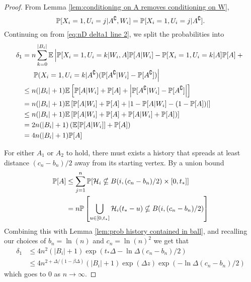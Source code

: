\begin{proof}
		From Lemma \ref{lem:conditioning on A removes conditioning on W},
		\begin{equation}
			\mathbb{P}[X_i = 1, U_i = j | A^\complement, W_i] = \mathbb{P}[X_i = 1, U_i = j | A^\complement].
		\end{equation} 
		Continuing on from \eqref{eq:nD delta1 line 2}, we split the probabilities into
		\begin{align}
			\delta_1 &= n \sum_{k = 0}^{|B_i|} \mathbb{E} \left| \mathbb{P}[X_i = 1, U_i = k|W_i, A]\mathbb{P}[A|W_i] - \mathbb{P}[X_i = 1, U_i = k| A]\mathbb{P}[A] + \vphantom{A^\complement} \right.\\
			&\hphantom{= .} \left.\mathbb{P}(X_i = 1, U_i = k | A^\complement) (\mathbb{P}[A^\complement|W_i] - \mathbb{P}[A^\complement]) \right| \notag \\
			&\leq n (|B_i| + 1) \mathbb{E}\left[ \mathbb{P}[A|W_i] + \mathbb{P}[A] + \left|\mathbb{P}[A^\complement|W_i] - \mathbb{P}[A^\complement]\right|\right]\\
			&= n (|B_i| + 1) \mathbb{E}\left[ \mathbb{P}[A|W_i] + \mathbb{P}[A] + \left|1 - \mathbb{P}[A|W_i] - (1 - \mathbb{P}[A])\right|\right]\\
			&\leq n (|B_i| + 1) \mathbb{E}\left[ \mathbb{P}[A|W_i] + \mathbb{P}[A] + \mathbb{P}[A|W_i] + \mathbb{P}[A])\right]\\
			&= 2 n (|B_i| + 1) \left(\mathbb{E}[\mathbb{P}[A|W_i]] + \mathbb{P}[A]\right)\\
			&= 4 n (|B_i| + 1) \mathbb{P}[A]
		\end{align}

		For either $A_1$ or $A_2$ to hold, there must exists a history that spreads at least distance $(c_n - b_n) / 2$ away from its starting vertex. 
		By a union bound
		\begin{align}
			\mathbb{P}[A] &\leq \sum_{j = 1}^n \mathbb{P}[\mathcal{H}_i \nsubseteq B(i, (c_n - b_n)/2) \times [0, t_*]]\\
				&= n \mathbb{P}\left[\bigcup_{u \in [0, t_*]}\mathcal{H}_i(t_* - u) \nsubseteq B(i, (c_n - b_n)/2)\right]
		\end{align}
		Combining this with Lemma \ref{lem:prob history contained in ball}, and recalling our choices of $b_n = \ln(n)$ and $c_n = \ln(n)^2$ we get that
		\begin{align}
			\delta_1 &\leq 4 n^2 (|B_i| + 1) \exp(t_* \Delta - \ln\Delta(c_n - b_n)/2)\\
			&\leq 4n^{2 + \Delta/(1 - \beta \Delta)}(|B_i| + 1)\exp(\Delta z) \exp(-\ln \Delta (c_n - b_n)/2)
		\end{align}
		which goes to $0$ as $n \rightarrow \infty$.



\end{proof}
